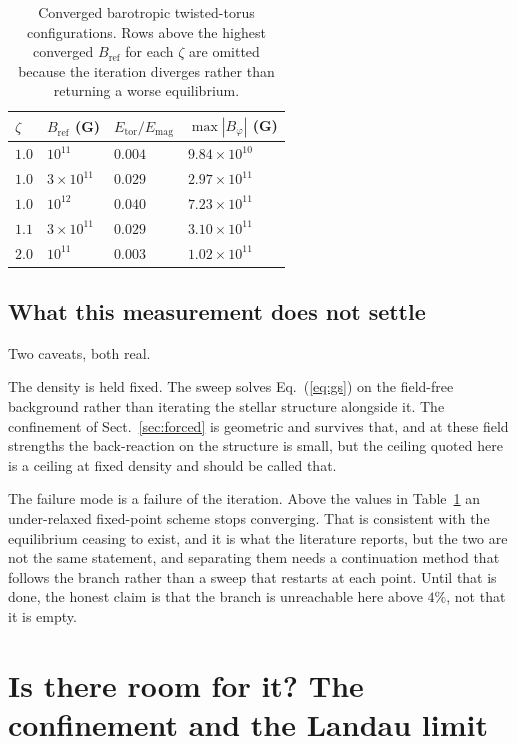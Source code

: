 \documentclass{aa}
\begin{document}
\begin{table}
\caption{Converged barotropic twisted-torus configurations. Rows above
the highest converged $B_{\mathrm{ref}}$ for each $\zeta$ are omitted
because the iteration diverges rather than returning a worse
equilibrium.}
\label{tab:ceiling}
\centering
\begin{tabular}{l l l l}
\hline\hline
$\zeta$ & $B_{\mathrm{ref}}$ (G) & $E_{\mathrm{tor}}/E_{\mathrm{mag}}$ &
$\max|B_\varphi|$ (G) \\
\hline
$1.0$ & $10^{11}$          & $0.004$ & $9.84\times10^{10}$ \\
$1.0$ & $3\times10^{11}$   & $0.029$ & $2.97\times10^{11}$ \\
$1.0$ & $10^{12}$          & $0.040$ & $7.23\times10^{11}$ \\
$1.1$ & $3\times10^{11}$   & $0.029$ & $3.10\times10^{11}$ \\
$2.0$ & $10^{11}$          & $0.003$ & $1.02\times10^{11}$ \\
\hline
\end{tabular}
\end{table}

\subsection{What this measurement does not settle}

Two caveats, both real.

The density is held fixed. The sweep solves Eq.~(\ref{eq:gs}) on the
field-free background rather than iterating the stellar structure
alongside it. The confinement of Sect.~\ref{sec:forced} is geometric and
survives that, and at these field strengths the back-reaction on the
structure is small, but the ceiling quoted here is a ceiling at fixed
density and should be called that.

The failure mode is a failure of the iteration. Above the values in
Table~\ref{tab:ceiling} an under-relaxed fixed-point scheme stops
converging. That is consistent with the equilibrium ceasing to exist, and
it is what the literature reports, but the two are not the same
statement, and separating them needs a continuation method that follows
the branch rather than a sweep that restarts at each point. Until that is
done, the honest claim is that the branch is unreachable here above
$4\%$, not that it is empty.


\section{Is there room for it? The confinement and the Landau limit}
\label{sec:room}
\end{document}
